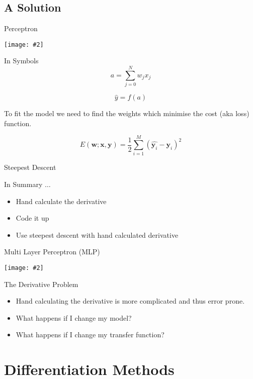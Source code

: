 \documentclass{beamer}
\newcommand {\framedgraphic}[2] {
    \begin{frame}{#1}
        \begin{center}
            \texttt{[image: \#2]}
        \end{center}
    \end{frame}
}
\begin{document}
\subsection{A Solution}

\framedgraphic{Perceptron}{diagrams/Fita1.png}

\begin{frame}[fragile]{In Symbols}
$$
a = \sum_{j=0}^{N} w_{j} x_j
$$

$$
\hat{y} = f(a)
$$

To fit the model we need to find the weights which minimise the cost
(aka loss) function.

$$
E(\boldsymbol{w}; \boldsymbol{x}, \boldsymbol{y}) =
\frac{1}{2}\sum_{i=1}^M(\hat{\boldsymbol{y}_i} - \boldsymbol{y}_i)^2
$$
\end{frame}

\begin{frame}[fragile]{Steepest Descent}
\end{frame}

\begin{frame}[fragile]{In Summary $\ldots$}
\begin{itemize}
\item Hand calculate the derivative
\item Code it up
\item Use steepest descent with hand calculated derivative
\end{itemize}
\end{frame}

\framedgraphic{Multi Layer Perceptron (MLP)}{diagrams/Fita2.png}

\begin{frame}[fragile]{The Derivative Problem}
\begin{itemize}
\item Hand calculating the derivative is more complicated and thus error prone.
\item What happens if I change my model?
\item What happens if I change my transfer function?
\end{itemize}
\end{frame}

\section{Differentiation Methods}
\end{document}
